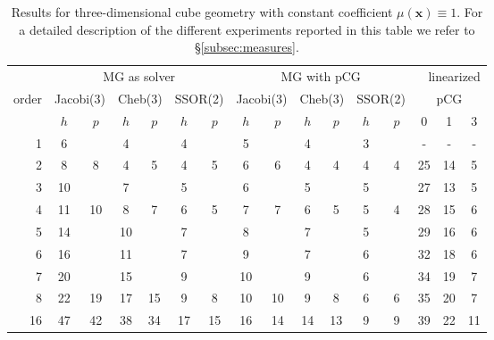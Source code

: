 \documentclass[smallcondensed,final]{svjour3}     %
\newcommand{\bs}[1]{\ensuremath{\boldsymbol #1}}
\begin{document}
\begin{table}
  \caption{\label{tab:3d-box} Results for three-dimensional cube
    geometry with constant coefficient $\mu(\bs x) \equiv 1$. For a
    detailed description of the different experiments reported in this
    table we refer to \S\ref{subsec:measures}.}  \centering
	  \begin{tabular}{|r|c c|c c|c c||c c|c c|c c||c c c|} 
	    \hline
	    & \multicolumn{6}{c||}{MG as solver} & \multicolumn{6}{c||}{MG with pCG} & \multicolumn{3}{r|}{linearized} \\
	    \cline{2-13}
	    \!\!\! order \!\!\!\! &  \multicolumn{2}{c|}{\!\scriptsize  Jacobi(3)\!} &  \multicolumn{2}{c|}{\!\scriptsize Cheb(3)\!} & \multicolumn{2}{c||}{\!\scriptsize  SSOR(2)\!} & \multicolumn{2}{c|}{\!\scriptsize Jacobi(3)\!} &  \multicolumn{2}{c|}{\!\scriptsize Cheb(3)\!} & \multicolumn{2}{c||}{\!\scriptsize SSOR(2)\!} & \multicolumn{3}{c|}{pCG}\\
	\hline
	 & $h$ & $p$ & $h$ & $p$& $h$ & $p$& $h$ & $p$& $h$ & $p$& $h$ & $p$& 0 & 1 & 3\\
	 \cline{2-16}
1 & 6 & & 4 & & 4 & & 5 & & 4 & & 3 & & - & - & - \\
2 & 8 & 8 & 4 & 5 & 4 & 5 & 6 & 6 & 4 & 4 & 4 & 4 &  25 & 14 & 5 \\
3 & 10 & & 7 & & 5 & & 6 & & 5 & & 5 & & 27 & 13 & 5  \\
4 & 11 & 10 & 8 & 7 & 6 & 5 & 7 & 7 & 6 & 5 & 5 & 4 & 28 & 15 & 6 \\
5 & 14 & & 10 & & 7 & & 8 & & 7 & & 5 & & 29 & 16 & 6 \\
6 & 16 & & 11 & & 7 & & 9 & & 7 & & 6 & & 32 & 18 & 6 \\
7 & 20 & & 15 & & 9 & & 10 & & 9 & & 6 & & 34 & 19 & 7 \\
8 & 22 & 19 & 17 & 15 & 9 & 8 & 10 & 10 & 9 & 8 & 6 & 6 & 35 & 20 & 7 \\
16 & 47 & 42 & 38 & 34 & 17 & 15 & 16 & 14 & 14 & 13 & 9 & 9 & 39 & 22 & 11 \\
\hline 
 \end{tabular}
\end{table}
\end{document}
